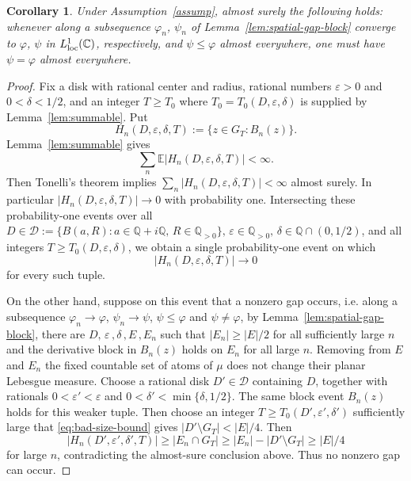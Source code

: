 \documentclass[10pt,reqno]{amsart}
\newtheorem{corollary}[theorem]{Corollary}
\theoremstyle{remark}
\newcommand{\E}{\mathbb E}
\newcommand{\Q}{\mathbb Q}
\begin{document}
\begin{corollary}\label{cor:no-affine-gap}
    Under Assumption~\ref{assump}, almost surely the following holds: whenever along a subsequence $\varphi_n$, $\psi_n$ of Lemma~\ref{lem:spatial-gap-block} converge to $\varphi$, $\psi$ in $L^1_{\rm loc}(\mathbb C)$, respectively, and $\psi\le \varphi$ almost everywhere, one must have $\psi=\varphi$ almost everywhere.
\end{corollary}
\begin{proof}
    Fix a disk with rational center and radius, rational numbers $\varepsilon>0$ and $0<\delta<1/2$, and an integer $T\ge T_0$ where $T_0=T_0(D,\varepsilon,\delta)$ is supplied by Lemma~\ref{lem:summable}. Put
    \[H_n(D,\varepsilon,\delta,T):=\{z\in G_T:B_n(z)\}.\] Lemma~\ref{lem:summable} gives
    \[\sum_{n}\E|H_n(D,\varepsilon, \delta, T)|<\infty.\]
    Then Tonelli's theorem implies $\sum_n |H_n(D,\varepsilon, \delta, T)|<\infty$ almost surely. In particular $|H_n(D,\varepsilon, \delta, T)|\to 0$ with probability one. Intersecting these probability-one events over all $D\in \mathcal{D}:=\{B(a,R):a\in\Q+i\Q,\,R\in \Q_{>0}\},\, \varepsilon\in \Q_{>0},\,\delta\in\Q\cap(0,1/2)$, and all integers $T\ge T_0(D,\varepsilon, \delta)$, we obtain a single probability-one event on which 
    \[|H_n(D,\varepsilon, \delta, T)|\to 0\]
    for every such tuple.
    
    On the other hand, suppose on this event that a nonzero gap occurs, i.e. along a subsequence $\varphi_n\to \varphi$, $\psi_n\to\psi$, $\psi\le \varphi$ and $\psi\ne \varphi$, by Lemma~\ref{lem:spatial-gap-block}, there are $D,\,\varepsilon\,,\delta\,,E\,,E_n$ such that $|E_n|\ge |E|/2$ for all sufficiently large $n$ and the derivative block in $B_n(z)$ holds on $E_n$ for all large $n$. Removing from $E$ and $E_n$ the fixed countable set of atoms of $\mu$ does not change their planar Lebesgue measure. Choose a rational disk $D'\in \mathcal{D}$ containing $D$, together with rationals $0<\varepsilon'<\varepsilon$ and $0<\delta'<\min\{\delta,1/2\}$. The same block event $B_n(z)$ holds for this weaker tuple. Then choose an integer $T\ge T_0(D',\varepsilon',\delta')$ sufficiently large that \eqref{eq:bad-size-bound} gives $|D'\setminus G_T|<|E|/4$. Then 
    \[|H_n(D',\varepsilon',\delta',T)|\ge |E_n\cap G_T|\ge |E_n|-|D'\setminus G_T|\ge |E|/4\]
    for large $n$, contradicting the almost-sure conclusion above. Thus no nonzero gap can occur.
\end{proof}
\end{document}
